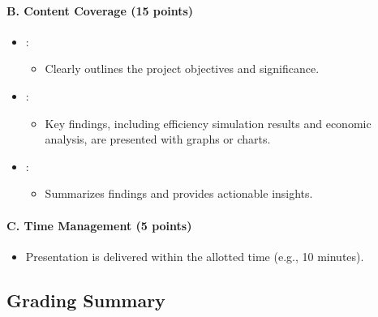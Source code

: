 \documentclass[letterpaper,10pt,english]{jupyterBook}
\begin{document}
\paragraph{B. Content Coverage (15 points)}
\label{\detokenize{ProjectInstructions:b-content-coverage-15-points}}\begin{itemize}
\item {} 
\sphinxAtStartPar
{}:
\begin{itemize}
\item {} 
\sphinxAtStartPar
Clearly outlines the project objectives and significance.

\end{itemize}

\item {} 
\sphinxAtStartPar
{}:
\begin{itemize}
\item {} 
\sphinxAtStartPar
Key findings, including efficiency simulation results and
economic analysis, are presented with graphs or charts.

\end{itemize}

\item {} 
\sphinxAtStartPar
{}:
\begin{itemize}
\item {} 
\sphinxAtStartPar
Summarizes findings and provides actionable insights.

\end{itemize}

\end{itemize}


\paragraph{C. Time Management (5 points)}
\label{\detokenize{ProjectInstructions:c-time-management-5-points}}\begin{itemize}
\item {} 
\sphinxAtStartPar
Presentation is delivered within the allotted time (e.g., 10
minutes).

\end{itemize}


\subsection{Grading Summary}
\label{\detokenize{ProjectInstructions:grading-summary}}
\sphinxAtStartPar
{}
\end{document}
